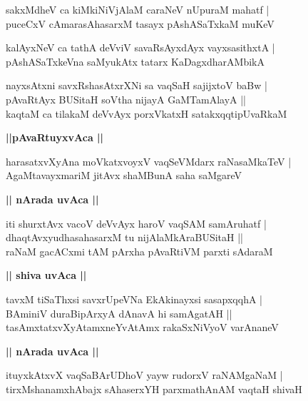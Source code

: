 \documentclass[twoside,12pt,openright]{book}
\newcounter{shloka}[chapter]
\def\uvaca#1{\centerline{{\large\textbf{#1}}}}
\begin{document}
\begin{shloka}%
sakxMdheV ca kiMkiNiVjAlaM caraNeV nUpuraM mahatf |\\
puceCxV cAmarasAhasarxM tasayx pAshASaTxkaM muKeV 
\end{shloka}

\begin{shloka}%
kalAyxNeV ca tathA deVviV savaRsAyxdAyx vayxsasithxtA |\\
pAshASaTxkeVna saMyukAtx tatarx KaDagxdharAMbikA 
\end{shloka}

\begin{shloka}%
nayxsAtxni savxRshasAtxrXNi sa vaqSaH sajijxtoV baBw |\\
pAvaRtAyx BUSitaH soVtha nijayA GaMTamAlayA ||\\
kaqtaM ca tilakaM deVvAyx porxVkatxH satakxqqtipUvaRkaM
\end{shloka}

\uvaca{||pAvaRtuyxvAca ||}

\begin{shloka}%
harasatxvXyAna moVkatxvoyxV vaqSeVMdarx raNasaMkaTeV |\\
AgaMtavayxmariM jitAvx shaMBunA saha saMgareV 
\end{shloka}

\uvaca{|| nArada uvAca ||}

\begin{shloka}%
iti shurxtAvx vacoV deVvAyx haroV vaqSAM samAruhatf |\\
dhaqtAvxyudhasahasarxM tu nijAlaMkAraBUSitaH ||\\
raNaM gacACxmi tAM pArxha pAvaRtiVM parxti sAdaraM 
\end{shloka}

\uvaca{|| shiva uvAca ||}

\begin{shloka}%
tavxM tiSaThxsi savxrUpeVNa EkAkinayxsi sasapxqqhA |\\
BAminiV duraBipArxyA dAnavA hi samAgatAH ||\\
tasAmxtatxvXyAtamxneYvAtAmx rakaSxNiVyoV varAnaneV
\end{shloka}

\uvaca{|| nArada uvAca ||}

\begin{shloka}%
ituyxkAtxvX vaqSaBArUDhoV yayw rudorxV raNAMgaNaM |\\
tirxMshanamxhAbajx sAhaserxYH parxmathAnAM vaqtaH shivaH 
\end{shloka}
\end{document}
